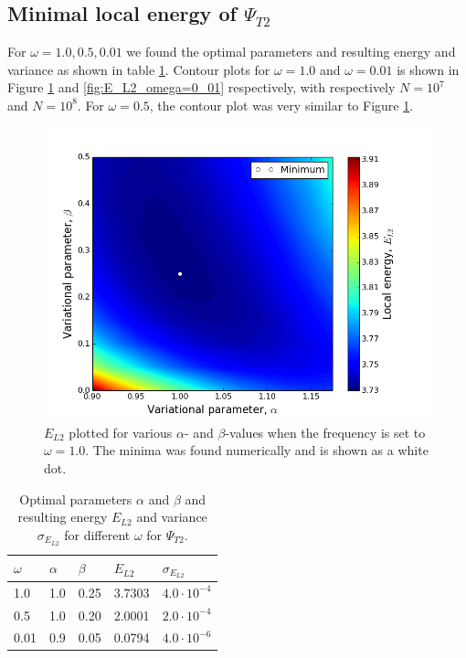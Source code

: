 \documentclass[norsk,a4paper,12pt]{article}
\begin{document}
\subsection{Minimal local energy of $\Psi_{T2}$}
For $\omega = 1.0, 0.5, 0.01$ we found the optimal parameters and resulting energy and variance as shown in table \ref{tab:Psi2results}. Contour plots for $\omega = 1.0$ and $\omega =0.01$ is shown in Figure \ref{fig:E_L2_omega=1_0} and \ref{fig:E_L2_omega=0_01} respectively, with respectively $N=10^7$ and $N=10^8$. For $\omega = 0.5$, the contour plot was very similar to Figure \ref{fig:E_L2_omega=1_0}. 
\begin{figure} [H]
    \centering
    \includegraphics[width=12cm]{E_L2_contour_omega=1_0.png}
    \caption{$E_{L2}$ plotted for various $\alpha$- and $\beta$-values when the frequency is set to $\omega=1.0$. The minima was found numerically and is shown as a white dot.}
    \label{fig:E_L2_omega=1_0}
\end{figure}

\begin{table} [H]
\centering
\caption{Optimal parameters $\alpha$ and $\beta$ and resulting energy $E_{L2}$ and variance $\sigma_{E_{L2}}$ for different $\omega$ for $\Psi_{T2}$.}
\begin{tabularx}{\textwidth}{XXXXX} \hline
\label{tab:Psi2results}
$\omega$ & $\alpha$ & $\beta$ & $E_{L2}$ & $\sigma_{E_{L2}}$ \\ \hline
1.0 & 1.0 & 0.25 & 3.7303 & $4.0\cdot 10^{-4}$ \\
0.5 & 1.0 & 0.20 & 2.0001 & $2.0\cdot 10^{-4}$ \\
0.01 & 0.9 & 0.05 & 0.0794 & $4.0\cdot 10^{-6}$ \\ \hline
\end{tabularx}
\end{table}
\end{document}
